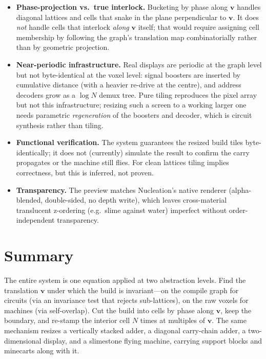 \documentclass[11pt]{article}
\newcommand{\vv}{\mathbf{v}}
\begin{document}
\begin{itemize}[leftmargin=1.4em]
\item \textbf{Phase-projection vs.\ true interlock.} Bucketing by phase along
$\vv$ handles diagonal lattices and cells that snake in the plane perpendicular
to $\vv$. It does \emph{not} handle cells that interlock \emph{along} $\vv$
itself; that would require assigning cell membership by following the graph's
translation map combinatorially rather than by geometric projection.

\item \textbf{Near-periodic infrastructure.} Real displays are periodic at the
graph level but not byte-identical at the voxel level: signal boosters are
inserted by cumulative distance (with a heavier re-drive at the centre), and
address decoders grow as a $\log N$ demux tree. Pure tiling reproduces the pixel
array but not this infrastructure; resizing such a screen to a working larger one
needs parametric \emph{regeneration} of the boosters and decoder, which is
circuit synthesis rather than tiling.

\item \textbf{Functional verification.} The system guarantees the resized build
tiles byte-identically; it does not (currently) simulate the result to confirm
the carry propagates or the machine still flies. For clean lattices tiling
implies correctness, but this is inferred, not proven.

\item \textbf{Transparency.} The preview matches Nucleation's native renderer
(alpha-blended, double-sided, no depth write), which leaves cross-material
translucent z-ordering (e.g.\ slime against water) imperfect without
order-independent transparency.
\end{itemize}

\section*{Summary}
The entire system is one equation applied at two abstraction levels. Find the
translation $\vv$ under which the build is invariant---on the compile graph for
circuits (via an invariance test that rejects sub-lattices), on the raw voxels
for machines (via self-overlap). Cut the build into cells by phase along $\vv$,
keep the boundary, and re-stamp the interior cell $N$ times at multiples of
$\vv$. The same mechanism resizes a vertically stacked adder, a diagonal
carry-chain adder, a two-dimensional display, and a slimestone flying machine,
carrying support blocks and minecarts along with it.
\end{document}
